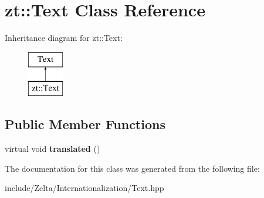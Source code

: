\hypertarget{classzt_1_1_text}{}\section{zt\+:\+:Text Class Reference}
\label{classzt_1_1_text}
Inheritance diagram for zt\+:\+:Text\+:\begin{figure}[H]
\begin{center}
\leavevmode
\includegraphics[height=2.000000cm]{classzt_1_1_text}
\end{center}
\end{figure}
\subsection*{Public Member Functions}
\begin{DoxyCompactItemize}
\item 
\mbox{\label{classzt_1_1_text_a3911db18eb027d801bac56dff1ea3bb5}} 
virtual void {\bfseries translated} ()
\end{DoxyCompactItemize}


The documentation for this class was generated from the following file\+:\begin{DoxyCompactItemize}
\item 
include/\+Zelta/\+Internationalization/Text.\+hpp\end{DoxyCompactItemize}
